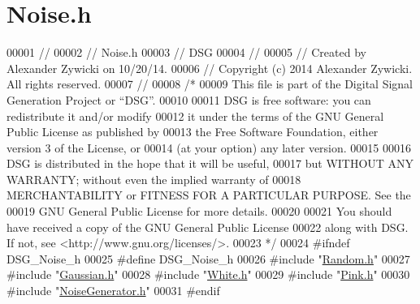 \hypertarget{_noise_8h_source}{\section{Noise.\+h}
\label{_noise_8h_source}
}

\begin{DoxyCode}
00001 \textcolor{comment}{//}
00002 \textcolor{comment}{//  Noise.h}
00003 \textcolor{comment}{//  DSG}
00004 \textcolor{comment}{//}
00005 \textcolor{comment}{//  Created by Alexander Zywicki on 10/20/14.}
00006 \textcolor{comment}{//  Copyright (c) 2014 Alexander Zywicki. All rights reserved.}
00007 \textcolor{comment}{//}
00008 \textcolor{comment}{/*}
00009 \textcolor{comment}{ This file is part of the Digital Signal Generation Project or “DSG”.}
00010 \textcolor{comment}{}
00011 \textcolor{comment}{ DSG is free software: you can redistribute it and/or modify}
00012 \textcolor{comment}{ it under the terms of the GNU General Public License as published by}
00013 \textcolor{comment}{ the Free Software Foundation, either version 3 of the License, or}
00014 \textcolor{comment}{ (at your option) any later version.}
00015 \textcolor{comment}{}
00016 \textcolor{comment}{ DSG is distributed in the hope that it will be useful,}
00017 \textcolor{comment}{ but WITHOUT ANY WARRANTY; without even the implied warranty of}
00018 \textcolor{comment}{ MERCHANTABILITY or FITNESS FOR A PARTICULAR PURPOSE.  See the}
00019 \textcolor{comment}{ GNU General Public License for more details.}
00020 \textcolor{comment}{}
00021 \textcolor{comment}{ You should have received a copy of the GNU General Public License}
00022 \textcolor{comment}{ along with DSG.  If not, see <http://www.gnu.org/licenses/>.}
00023 \textcolor{comment}{ */}
00024 \textcolor{preprocessor}{#ifndef DSG\_Noise\_h}
00025 \textcolor{preprocessor}{#define DSG\_Noise\_h}
00026 \textcolor{preprocessor}{#include "\hyperlink{_random_8h}{Random.h}"}
00027 \textcolor{preprocessor}{#include "\hyperlink{_gaussian_8h}{Gaussian.h}"}
00028 \textcolor{preprocessor}{#include "\hyperlink{_white_8h}{White.h}"}
00029 \textcolor{preprocessor}{#include "\hyperlink{_pink_8h}{Pink.h}"}
00030 \textcolor{preprocessor}{#include "\hyperlink{_noise_generator_8h}{NoiseGenerator.h}"}
00031 \textcolor{preprocessor}{#endif}
\end{DoxyCode}
